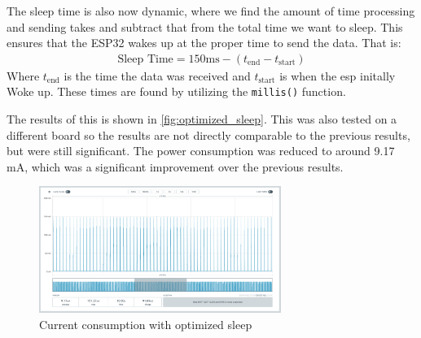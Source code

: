 \documentclass{article}
\begin{document}
The sleep time is also now dynamic, where we find the amount of time processing and sending takes and subtract that from the total time we want to sleep. This ensures that the ESP32 wakes up at the proper time to send the data. That is:
\begin{align*}
    \text{Sleep Time} = 150\text{ms} - (t_{\text{end}} - t_{\text{start}})
\end{align*}
Where $t_{\text{end}}$ is the time the data was received and $t_{\text{start}}$ is when the esp initally Woke up. These times are found by utilizing the \texttt{millis()} function.

The results of this is shown in \autoref{fig:optimized_sleep}. This was also tested on a different board so the results are not directly comparable to the previous results, but were still significant. The power consumption was reduced to around 9.17 mA, which was a significant improvement over the previous results.
\begin{figure}[ht!]
    \centering
    \includegraphics[width=0.70\textwidth]{4th benchmark.png}
    \caption{Current consumption with optimized sleep}
    \label{fig:optimized_sleep}
\end{figure}



\end{document}
